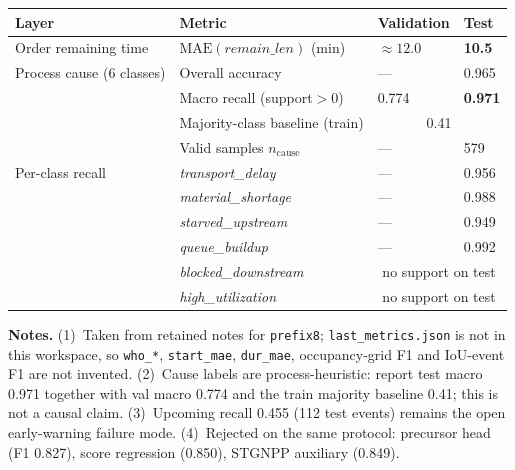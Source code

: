 \documentclass[10pt,a4paper]{article}
\begin{document}
\begin{center}
\begin{tabular}{l l l l}
\toprule
Layer & Metric & Validation & Test \\
\midrule
Order remaining time
  & $\mathrm{MAE}(\textit{remain\_len})$ (min)
  & $\approx 12.0$
  & \textbf{10.5} \\
\midrule
Process cause (6 classes)
  & Overall accuracy
  & ---
  & 0.965 \\
  & Macro recall (support${>}0$)
  & 0.774
  & \textbf{0.971} \\
  & Majority-class baseline (train)
  & \multicolumn{2}{c}{0.41} \\
  & Valid samples $n_{\mathrm{cause}}$
  & ---
  & 579 \\
\midrule
Per-class recall
  & \textit{transport\_delay}
  & --- & 0.956 \\
  & \textit{material\_shortage}
  & --- & 0.988 \\
  & \textit{starved\_upstream}
  & --- & 0.949 \\
  & \textit{queue\_buildup}
  & --- & 0.992 \\
  & \textit{blocked\_downstream}
  & \multicolumn{2}{c}{no support on test} \\
  & \textit{high\_utilization}
  & \multicolumn{2}{c}{no support on test} \\
\bottomrule
\end{tabular}
\end{center}

\small
\textbf{Notes.}
(1)~Taken from retained notes for \texttt{prefix8}; \texttt{last\_metrics.json} is not in this workspace, so \texttt{who\_*}, \texttt{start\_mae}, \texttt{dur\_mae}, occupancy-grid F1 and IoU-event F1 are not invented.
(2)~Cause labels are process-heuristic: report test macro 0.971 together with val macro 0.774 and the train majority baseline 0.41; this is not a causal claim.
(3)~Upcoming recall 0.455 (112 test events) remains the open early-warning failure mode.
(4)~Rejected on the same protocol: precursor head (F1 0.827), score regression (0.850), STGNPP auxiliary (0.849).
\end{document}
